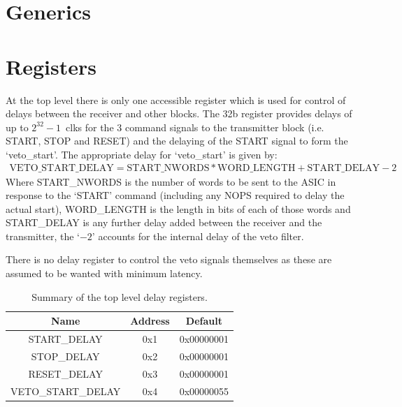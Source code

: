 \section{Generics} %
\label{sub:top_generics}
\section{Registers} %
\label{sub:top_registers}
At the top level there is only one accessible register which is used for control of delays between the receiver and other blocks. The 32b register provides delays of up to \( 2^{32} - 1 \)~clks for the 3 command signals to the transmitter block (i.e. START, STOP and RESET) and the delaying of the START signal to form the `veto\_start'. The appropriate delay for `veto\_start' is given by:
\begin{align}\label{equ:veto_start_delay}
    \text{VETO\_START\_DELAY} = \text{START\_NWORDS} * \text{WORD\_LENGTH} + \text{START\_DELAY} - 2 
\end{align}
Where START\_NWORDS is the number of words to be sent to the ASIC in response to the `START' command (including any NOPS required to delay the actual start), WORD\_LENGTH is the length in bits of each of those words and START\_DELAY is any further delay added between the receiver and the transmitter, the `\(- 2\)' accounts for the internal delay of the veto filter. %
    
There is no delay register to control the veto signals themselves as these are assumed to be wanted with minimum latency.
    
\begin{table}
    \begin{center}
        \begin{tabular}{c | c | c }
            Name               & Address & Default    \\
            \hline
            START\_DELAY       & 0x1     & 0x00000001 \\
            STOP\_DELAY        & 0x2     & 0x00000001 \\
            RESET\_DELAY       & 0x3     & 0x00000001 \\
            VETO\_START\_DELAY & 0x4     & 0x00000055 \\
        \end{tabular}
    \end{center}
    \caption{Summary of the top level delay registers.}
    \label{tab:delay_regs}
\end{table}
